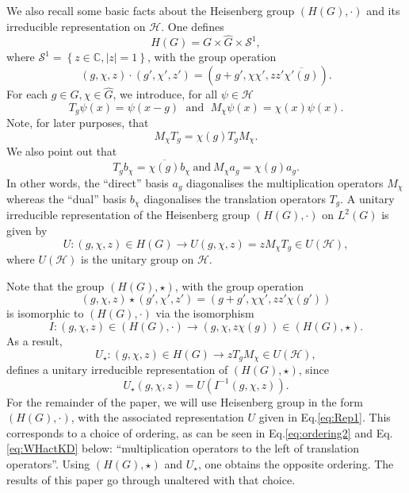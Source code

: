 \documentclass[a4paper, notitlepage, 11pt]{article}
\numberwithin{equation}{section}
\newcommand{\mcl}[1]{\ensuremath{\mathcal{#1}}}
\newcommand{\Hcal}{{\mcl H}}
\newcommand{\C}{\ensuremath{\mathbb{C}}}
\begin{document}
We also recall some basic facts about the Heisenberg group $(H(G),\cdot)$ and its irreducible representation on $\Hcal$. One defines
\begin{equation}
    H(G)=G\times \hat{G}\times \mcl{S}^1,
\end{equation}
where $\mcl{S}^{1} = \left\{ z\in \C, \left|z\right|=1\right\}$, with the  group operation
\begin{equation}
    (g,\chi,z)\cdot (g',\chi',z') = (g+g',\chi\chi', z z'\overline{\chi'(g)}).
\end{equation}
For each $g\in G, \chi\in \hat G$, we introduce, for all $\psi\in\Hcal$
\begin{equation}
T_{g}\psi(x) = \psi(x-g) \;\text{ and }\;
 M_{\chi}\psi(x) = \chi(x)\psi(x).
\end{equation}
Note, for later purposes, that 
\begin{equation}
    M_\chi T_g=\chi(g)T_gM_\chi.
\end{equation}
We also point out that
\begin{equation}
T_g b_\chi=\overline{\chi(g)}b_\chi \mathrm{\ and \ } M_\chi a_g=\chi(g)a_g.
\end{equation}
In other words, the ``direct'' basis $a_g$ diagonalises the multiplication operators $M_\chi$ whereas the ``dual'' basis $b_\chi$ diagonalises the translation operators $T_g$. 
A unitary irreducible representation of the Heisenberg group $(H(G),\cdot)$ on $L^{2}(G)$ is given by
\begin{equation}\label{eq:Rep1}
U:(g,\chi,z)\in H(G)\to U(g,\chi, z)=zM_{\chi}T_{g}\in U(\Hcal),
\end{equation}
where $U(\Hcal)$ is the unitary group on $\Hcal$.

Note that the group $(H(G),\star)$, with the group operation
\begin{equation}
    (g,\chi,z) \star (g',\chi',z') = (g+g',\chi\chi', z z'\chi(g'))
\end{equation}
is isomorphic to $(H(G),\cdot)$ via the isomorphism
\begin{equation}
    I: (g,\chi,z)\in (H(G), \cdot)  \to   (g,\chi,z\chi(g))\in (H(G), \star).
\end{equation}
As a result, 
\[
U_{\star}:(g,\chi,z)\in H(G)\to zT_{g}M_{\chi}\in U(\Hcal),
\]
defines a unitary irreducible representation of $(H(G),\star)$, since 
$$
U_\star(g,\chi,z)=U(I^{-1}(g,\chi,z)).
$$
For the remainder of the paper, we will use Heisenberg group in the form $(H(G),\cdot)$, with the associated representation $U$ given in Eq.\eqref{eq:Rep1}. This corresponds to a choice of ordering, as can be seen in Eq.\eqref{eq:ordering2} and Eq.\eqref{eq:WHactKD} below:  ``multiplication operators to the left of translation operators''. Using $(H(G),\star)$ and $U_{\star}$, one obtains the opposite ordering. The results of this paper go through unaltered with that choice.  
\end{document}

